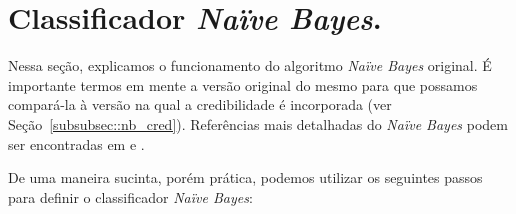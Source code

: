
\section{Classificador \textit{Naïve Bayes}.}
\label{subsec::cred_nb}

Nessa seção, explicamos o funcionamento do algoritmo \textit{Naïve Bayes} original. É importante termos em mente a versão original do mesmo para que possamos compará-la à versão na qual a credibilidade é incorporada (ver Seção~\ref{subsubsec::nb_cred}). Referências mais detalhadas do \textit{Naïve Bayes} podem ser encontradas em \cite{DHS01} e \cite{Manning08}.

De uma maneira sucinta, porém prática, podemos utilizar os seguintes passos para definir o classificador \textit{Naïve Bayes}:

